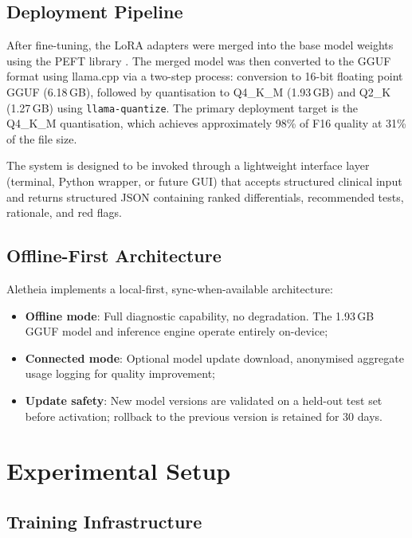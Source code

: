 \documentclass[journal]{IEEEtran}
\begin{document}
\subsection{Deployment Pipeline}

After fine-tuning, the LoRA adapters were merged into the base
model weights using the PEFT library \cite{peft2023}. The merged
model was then converted to the GGUF format using llama.cpp
\cite{gerganov2023llamacpp} via a two-step process: conversion to
16-bit floating point GGUF (6.18\,GB), followed by quantisation
to Q4\_K\_M (1.93\,GB) and Q2\_K (1.27\,GB) using
\texttt{llama-quantize}. The primary deployment target is the
Q4\_K\_M quantisation, which achieves approximately 98\% of F16
quality at 31\% of the file size.

The system is designed to be invoked through a lightweight interface
layer (terminal, Python wrapper, or future GUI) that accepts
structured clinical input and returns structured JSON containing
ranked differentials, recommended tests, rationale, and red flags.

\subsection{Offline-First Architecture}

Aletheia implements a local-first, sync-when-available architecture:
\begin{itemize}
  \item \textbf{Offline mode}: Full diagnostic capability, no
        degradation. The 1.93\,GB GGUF model and inference engine
        operate entirely on-device;
  \item \textbf{Connected mode}: Optional model update download,
        anonymised aggregate usage logging for quality improvement;
  \item \textbf{Update safety}: New model versions are validated on
        a held-out test set before activation; rollback to the
        previous version is retained for 30 days.
\end{itemize}

\section{Experimental Setup}
\label{sec:experiments}

\subsection{Training Infrastructure}
\end{document}
